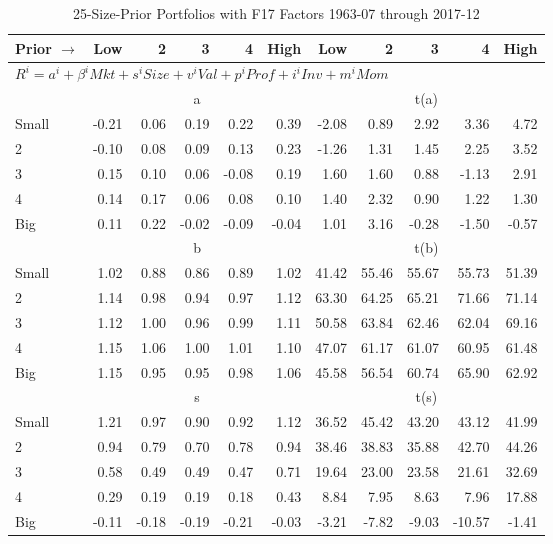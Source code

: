 
\begin{table}[H]
\footnotesize
\centering
\caption{25-Size-Prior Portfolios with F17 Factors 1963-07 through 2017-12}
\begin{tabular}{lrrrrrrrrrr}
  \toprule
    
    Prior $\rightarrow$ & Low & 2 & 3 & 4 & High & Low & 2 & 3 & 4 & High  \\ 
  \midrule
  \multicolumn{11}{l}{$R^i=a^i+\beta^iMkt+s^iSize+v^iVal+p^iProf+i^iInv+m^iMom$}  \\
  
     & \multicolumn{5}{c}{a} & \multicolumn{5}{c}{t(a)}   \\
     \cmidrule(r){2-6} \cmidrule(r){7-11} 
    Small  & -0.21  & 0.06  & 0.19  & 0.22  & 0.39  & -2.08  & 0.89  & 2.92  & 3.36  & 4.72   \\
    2  & -0.10  & 0.08  & 0.09  & 0.13  & 0.23  & -1.26  & 1.31  & 1.45  & 2.25  & 3.52   \\
    3  & 0.15  & 0.10  & 0.06  & -0.08  & 0.19  & 1.60  & 1.60  & 0.88  & -1.13  & 2.91   \\
    4  & 0.14  & 0.17  & 0.06  & 0.08  & 0.10  & 1.40  & 2.32  & 0.90  & 1.22  & 1.30   \\
    Big  & 0.11  & 0.22  & -0.02  & -0.09  & -0.04  & 1.01  & 3.16  & -0.28  & -1.50  & -0.57   \\
    
  
     & \multicolumn{5}{c}{b} & \multicolumn{5}{c}{t(b)}   \\
     \cmidrule(r){2-6} \cmidrule(r){7-11} 
    Small  & 1.02  & 0.88  & 0.86  & 0.89  & 1.02  & 41.42  & 55.46  & 55.67  & 55.73  & 51.39   \\
    2  & 1.14  & 0.98  & 0.94  & 0.97  & 1.12  & 63.30  & 64.25  & 65.21  & 71.66  & 71.14   \\
    3  & 1.12  & 1.00  & 0.96  & 0.99  & 1.11  & 50.58  & 63.84  & 62.46  & 62.04  & 69.16   \\
    4  & 1.15  & 1.06  & 1.00  & 1.01  & 1.10  & 47.07  & 61.17  & 61.07  & 60.95  & 61.48   \\
    Big  & 1.15  & 0.95  & 0.95  & 0.98  & 1.06  & 45.58  & 56.54  & 60.74  & 65.90  & 62.92   \\
    
  
     & \multicolumn{5}{c}{s} & \multicolumn{5}{c}{t(s)}   \\
     \cmidrule(r){2-6} \cmidrule(r){7-11} 
    Small  & 1.21  & 0.97  & 0.90  & 0.92  & 1.12  & 36.52  & 45.42  & 43.20  & 43.12  & 41.99   \\
    2  & 0.94  & 0.79  & 0.70  & 0.78  & 0.94  & 38.46  & 38.83  & 35.88  & 42.70  & 44.26   \\
    3  & 0.58  & 0.49  & 0.49  & 0.47  & 0.71  & 19.64  & 23.00  & 23.58  & 21.61  & 32.69   \\
    4  & 0.29  & 0.19  & 0.19  & 0.18  & 0.43  & 8.84  & 7.95  & 8.63  & 7.96  & 17.88   \\
    Big  & -0.11  & -0.18  & -0.19  & -0.21  & -0.03  & -3.21  & -7.82  & -9.03  & -10.57  & -1.41   \\
    

\end{tabular}
\end{table}
